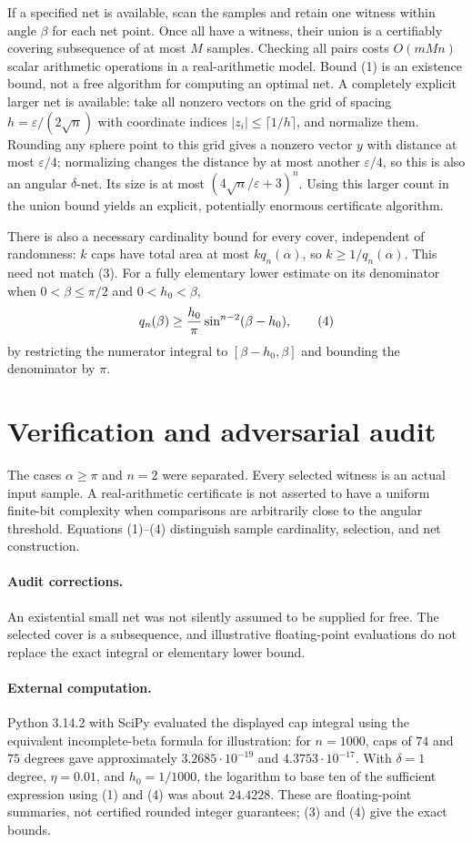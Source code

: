 \documentclass[11pt]{article}
\begin{document}
If a specified net is available, scan the samples and retain one witness within angle $\beta$ for each net point. Once all have a witness, their union is a certifiably covering subsequence of at most $M$ samples. Checking all pairs costs $O(mMn)$ scalar arithmetic operations in a real-arithmetic model. Bound (1) is an existence bound, not a free algorithm for computing an optimal net. A completely explicit larger net is available: take all nonzero vectors on the grid of spacing $h=\varepsilon/(2\sqrt n)$ with coordinate indices $|z_i|\leq\lceil1/h\rceil$, and normalize them. Rounding any sphere point to this grid gives a nonzero vector $y$ with distance at most $\varepsilon/4$; normalizing changes the distance by at most another $\varepsilon/4$, so this is also an angular $\delta$-net. Its size is at most $(4\sqrt n/\varepsilon+3)^n$. Using this larger count in the union bound yields an explicit, potentially enormous certificate algorithm.

There is also a necessary cardinality bound for every cover, independent of randomness: $k$ caps have total area at most $k q_n(\alpha)$, so $k\geq1/q_n(\alpha)$. This need not match (3). For a fully elementary lower estimate on its denominator when $0<\beta\leq\pi/2$ and $0<h_0<\beta$,
\[
 q_n(\beta)\geq {h_0\over\pi}\sin^{n-2}(\beta-h_0),        \tag{4}
\]
by restricting the numerator integral to $[\beta-h_0,\beta]$ and bounding the denominator by $\pi$.
\section{Verification and adversarial audit}
The cases $\alpha\geq\pi$ and $n=2$ were separated. Every selected witness is an actual input sample. A real-arithmetic certificate is not asserted to have a uniform finite-bit complexity when comparisons are arbitrarily close to the angular threshold. Equations (1)--(4) distinguish sample cardinality, selection, and net construction.
\paragraph{Audit corrections.} An existential small net was not silently assumed to be supplied for free. The selected cover is a subsequence, and illustrative floating-point evaluations do not replace the exact integral or elementary lower bound.
\paragraph{External computation.} Python 3.14.2 with SciPy evaluated the displayed cap integral using the equivalent incomplete-beta formula for illustration: for $n=1000$, caps of $74$ and $75$ degrees gave approximately $3.2685\cdot10^{-19}$ and $4.3753\cdot10^{-17}$. With $\delta=1$ degree, $\eta=0.01$, and $h_0=1/1000$, the logarithm to base ten of the sufficient expression using (1) and (4) was about $24.4228$. These are floating-point summaries, not certified rounded integer guarantees; (3) and (4) give the exact bounds.
\end{document}

